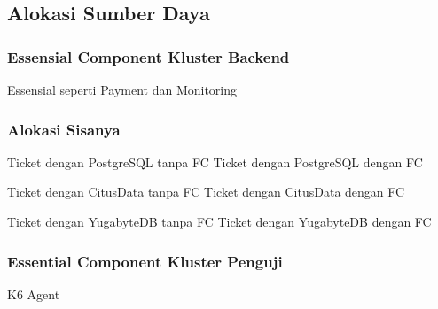 \subsection{Alokasi Sumber Daya}

\subsubsection{Essensial Component Kluster Backend}
Essensial seperti Payment dan Monitoring




\subsubsection{Alokasi Sisanya}

Ticket dengan PostgreSQL tanpa FC
Ticket dengan PostgreSQL dengan FC

Ticket dengan CitusData tanpa FC
Ticket dengan CitusData dengan FC

Ticket dengan YugabyteDB tanpa FC
Ticket dengan YugabyteDB dengan FC


\subsubsection{Essential Component Kluster Penguji}


K6 Agent

